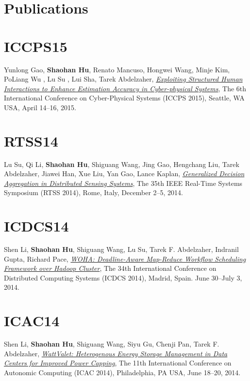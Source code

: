 \section{\sc Publications}

\section{\sc ICCPS15}\hypertarget{gao2015iccps}{}
Yunlong Gao, \textbf{Shaohan Hu}, Renato Mancuso, Hongwei Wang, Minje Kim, PoLiang Wu , Lu Su , Lui Sha, Tarek Abdelzaher, \href{}{\emph{Exploiting Structured Human Interactions to Enhance Estimation Accuracy in Cyber-physical Systems}}, \textsf{The 6th International Conference on Cyber-Physical Systems (ICCPS 2015)}, Seattle, WA USA, April 14--16, 2015.

\section{\sc RTSS14}\hypertarget{su2014rtss}{}
Lu Su, Qi Li, \textbf{Shaohan Hu}, Shiguang Wang, Jing Gao, Hengchang Liu, Tarek Abdelzaher, Jiawei Han, Xue Liu, Yan Gao, Lance Kaplan, \href{}{\emph{Generalized Decision Aggregation in Distributed Sensing Systems}}, \textsf{The 35th IEEE Real-Time Systems Symposium (RTSS 2014)}, Rome, Italy, December 2--5, 2014.

\section{\sc ICDCS14}\hypertarget{li2014icdcs}{}
Shen Li, \textbf{Shaohan Hu}, Shiguang Wang, Lu Su, Tarek F. Abdelzaher, Indranil Gupta, Richard Pace, \href{http://dl.acm.org/citation.cfm?id=2672596.2672734}{\emph{WOHA: Deadline-Aware Map-Reduce Workflow Scheduling Framework over Hadoop Cluster}}, \textsf{The 34th International Conference on Distributed Computing Systems (ICDCS 2014)}, Madrid, Spain. June 30--July 3, 2014.

\section{\sc ICAC14}\hypertarget{li2014icac}{}
Shen Li, \textbf{Shaohan Hu}, Shiguang Wang, Siyu Gu, Chenji Pan, Tarek F. Abdelzaher, \href{https://www.usenix.org/system/files/conference/icac14/icac14-paper-li_shen.pdf}{\emph{WattValet: Heterogenous Energy Storage Management in Data Centers for Improved Power Capping}}, \textsf{The 11th International Conference on Autonomic Computing (ICAC 2014)}, Philadelphia, PA USA, June 18--20, 2014.

